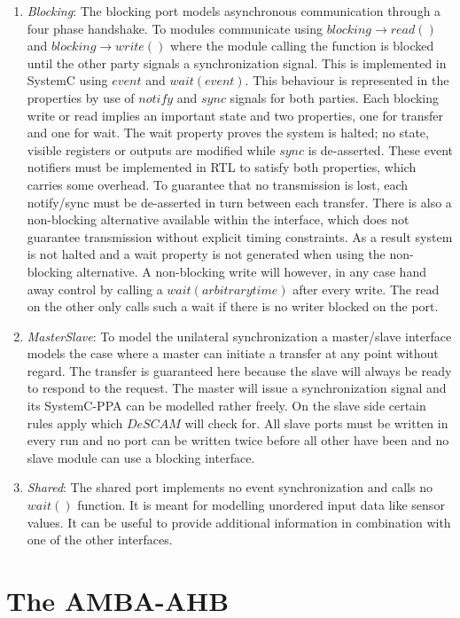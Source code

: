 \begin{enumerate}
 \item \textit{Blocking}: The blocking port models asynchronous communication through a four phase handshake. To modules communicate using $blocking\rightarrow read()$ and $blocking\rightarrow write()$ where the module calling the function is blocked until the other party signals a synchronization signal. This is implemented in SystemC using $event$ and $wait(event)$. This behaviour is represented in the properties by use of $notify$ and $sync$ signals for both parties. Each blocking write or read implies an important state and two properties, one for transfer and one for wait. The wait property proves the system is halted; no state, visible registers or outputs are modified while $sync$ is de-asserted. These event notifiers must be implemented in RTL to satisfy both properties, which carries some overhead. To guarantee that no transmission is lost, each notify/sync must be de-asserted in turn between each transfer. There is also a non-blocking alternative available within the interface, which does not guarantee transmission without explicit timing constraints. As a result  system is not halted and a wait property is not generated when using the non-blocking alternative. A non-blocking write will however, in any case hand away control by calling a $wait(arbitrary time)$ after every write. The read on the other only calls such a wait if there is no writer blocked on the port.  
 \item \textit{MasterSlave}: To model the unilateral synchronization a master/slave interface models the case where a master can initiate a transfer at any point without regard. The transfer is guaranteed here because the slave will always be ready to respond to the request. The master will issue a synchronization signal and its SystemC-PPA can be modelled rather freely. On the slave side certain rules apply which $DeSCAM$ will check for. All slave ports must be written in every run and no port can be written twice before all other have been and no slave module can use a blocking interface.
 \item \textit{Shared}: The shared port implements no event synchronization and calls no $wait()$ function. It is meant for modelling unordered input data like sensor values. It can be useful to provide additional information in combination with one of the other interfaces.   
\end{enumerate} 


\section{The AMBA-AHB}
\label{sec:ahb}

